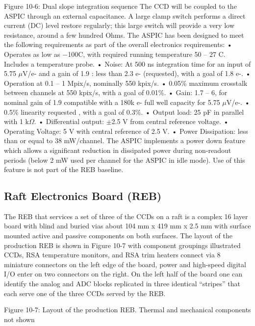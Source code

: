 Figure 10-6: Dual slope integration sequence
The CCD will be coupled to the ASPIC through an external capacitance. A large clamp switch performs a direct current (DC) level restore regularly; this large switch will provide a very low resistance, around a few hundred Ohms.
The ASPIC has been designed to meet the following requirements as part of the overall electronics requirements:
•	Operates as low as $-$100C, with required running temperature  50 – 27 C. Includes a temperature probe.
•	Noise: At 500 ns integration time for an input of 5.75 $\mu$V/e- and a gain of 1.9 : less than  2.3 e- (requested),  with a goal of 1.8 e-.
•	Operation at 0.1 – 1 Mpix/s, nominally 550 kpix/s.
•	0.05\% maximum crosstalk between channels at 550 kpix/s, with a goal of 0.01\%.
•	Gain: 1.7 – 6, for nominal gain of 1.9 compatible with a 180k e- full well capacity for 5.75 $\mu$V/e-.
•	0.5\% linearity requested , with a goal of 0.3\%.
•	Output load: 25 pF in parallel with 1 k$\Omega$.
•	Differential output: $\pm$2.5 V from central reference voltage.
•	Operating Voltage: 5 V with central reference of 2.5 V.
•	Power Dissipation: less than or equal to 38 mW/channel.
The ASPIC implements a power down feature which allows a significant reduction in dissipated power during non-readout periods (below 2 mW used per channel for the ASPIC in idle mode). Use of this feature is not part of the REB baseline.

\subsection{Raft Electronics Board (REB)}
The REB that services a set of three of the CCDs on a raft is a complex 16 layer board with blind and buried vias about 104 mm x 419 mm x 2.5 mm with surface mounted active and passive components on both surfaces. The layout of the production REB is shown in Figure 10-7 with component groupings illustrated CCDs, RSA temperature monitors, and  RSA trim heaters connect via 8 miniature connectors on the left edge of the board, power and high-speed digital I/O enter on two connectors on the right. On the left half of the board one can identify the analog and ADC blocks replicated in three identical “stripes” that each serve one of the three CCDs served by the REB.
 
Figure 10-7: Layout of the production REB. Thermal and mechanical components not shown

